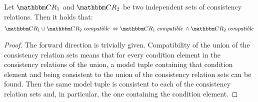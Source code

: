 \begin{theorem} \label{theorem:independencecompatibility}
    Let $\consistencyrelationset{CR}_{1}$ and $\consistencyrelationset{CR}_{2}$ be two independent sets of consistency relations. Then it holds that:
    \begin{align*}
        \consistencyrelationset{CR}_{1} \cup \consistencyrelationset{CR}_{2} \compatiblemath \equivalent
        \consistencyrelationset{CR}_{1} \compatiblemath \land \consistencyrelationset{CR}_{2} \compatiblemath
    \end{align*}
\end{theorem}
\begin{proof}
    The forward direction is trivially given. 
    Compatibility of the union of the consistency relation sets means that for every condition element in the consistency relations of the union, a model tuple containing that condition element and being consistent to the union of the consistency relation sets can be found. Then the same model tuple is consistent to each of the consistency relation sets and, in particular, the one containing the condition element.


\end{proof}
